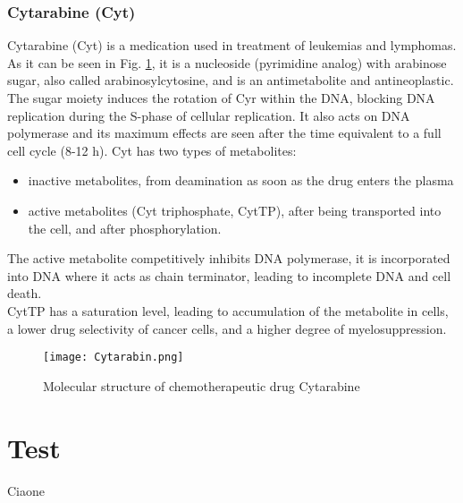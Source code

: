 \subsubsection{Cytarabine (Cyt)}
Cytarabine (Cyt) is a medication used in treatment of leukemias and lymphomas. As it can be seen in Fig. \ref{fig:Cyt}, it is a nucleoside (pyrimidine analog) with arabinose sugar, also called arabinosylcytosine, and is an antimetabolite and antineoplastic.
The sugar moiety induces the rotation of Cyr within the DNA, blocking DNA replication during the S-phase of cellular replication. It also acts on DNA polymerase and its maximum effects are seen after the time equivalent to a full cell cycle (8-12 h).
Cyt has two types of metabolites: 
\begin{itemize}
	\item inactive metabolites, from deamination as soon as the drug enters the plasma
	\item active metabolites (Cyt triphosphate, CytTP), after being transported into the cell, and after phosphorylation.
\end{itemize}
The active metabolite competitively inhibits DNA polymerase, it is incorporated into DNA where it acts as chain terminator, leading to incomplete DNA and cell death.\\
CytTP has a saturation level, leading to accumulation of the metabolite in cells, a lower drug selectivity of cancer cells, and a higher degree of myelosuppression.\cite{cyt-1, cyt-2}
\begin{figure}[htbp!]
	\centering
	\texttt{[image: Cytarabin.png]}
	\caption{Molecular structure of chemotherapeutic drug Cytarabine}
	\label{fig:Cyt}
\end{figure}
\section{Test}
\noindent Ciaone


